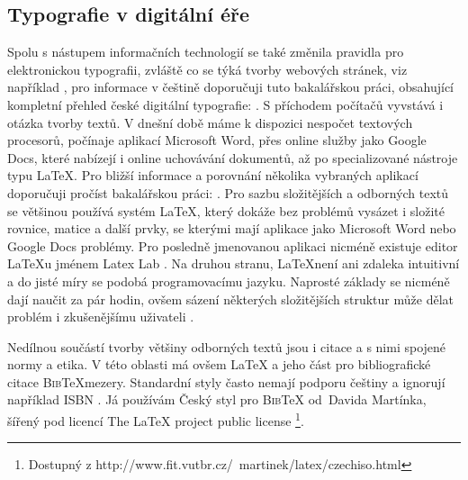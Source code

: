 \documentclass[a4paper, 11pt]{article}
\begin{document}
 \subsection*{Typografie v digitální éře}
Spolu s nástupem informačních technologií se také změnila pravidla pro elektronickou typografii, zvláště co se týká tvorby webových stránek, viz například \cite{Strizver:DiffPrintvsWeb}, pro informace v češtině doporučuji tuto bakalářskou práci, obsahující kompletní přehled české digitální typografie: \cite{BP:SirucekPravidla}. 
S příchodem počítačů vyvstává i otázka tvorby textů. V dnešní době máme k dispozici nespočet textových procesorů, počínaje aplikací Microsoft Word, přes online služby jako Google Docs, které nabízejí i online uchovávání dokumentů, až po specializované nástroje typu \LaTeX. Pro bližší informace a porovnání několika vybraných aplikací doporučuji pročíst bakalářskou práci: \cite{BP:LukesEditory}.
Pro sazbu složitějších a odborných textů se většinou používá systém \LaTeX, který dokáže bez problémů vysázet i složité rovnice, matice a další prvky, se kterými mají aplikace jako Microsoft Word nebo Google Docs problémy. Pro posledně jmenovanou aplikaci nicméně existuje editor \LaTeX u jménem Latex Lab \cite{Cizek:LatexLab}. Na druhou stranu, \LaTeX není ani zdaleka intuitivní a do jisté míry se podobá programovacímu jazyku. Naprosté základy se nicméně dají naučit za pár hodin, ovšem sázení některých složitějších struktur může dělat problém i zkušenějšímu uživateli \cite{Latex:Tricks}.

Nedílnou součástí tvorby většiny odborných textů jsou i citace a s nimi spojené normy a etika. V této oblasti má ovšem \LaTeX { }a jeho část pro bibliografické citace \textsc{Bib}\TeX mezery. Standardní styly často nemají podporu češtiny a ignorují například ISBN \cite{Martinek:Latex}. Já používám Český styl pro \textsc{Bib}\TeX { }od~Davida Martínka, šířený pod licencí The LaTeX project public license \footnote{Dostupný z http://www.fit.vutbr.cz/~martinek/latex/czechiso.html}. 


\newpage %

\def\refname{Použité zdroje}

\end{document}
